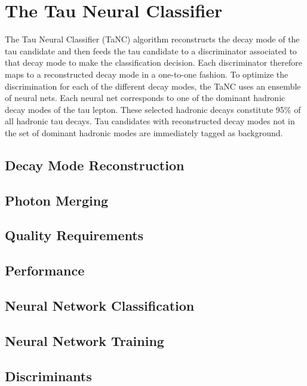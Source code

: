 \section{The Tau Neural Classifier}
\label{sec:Tanc}
%
The Tau Neural Classifier (TaNC) algorithm reconstructs the decay mode of the
tau candidate and then feeds the tau candidate to a discriminator associated
to that decay mode to make the classification decision.  Each discriminator
therefore maps to a reconstructed decay mode in a one-to-one fashion.  To
optimize the discrimination for each of the different decay modes, the TaNC uses
an ensemble of neural nets.  Each neural net corresponds to one of the dominant
hadronic decay modes of the tau lepton.  These selected hadronic decays
constitute 95\% of all hadronic tau decays.  Tau candidates with reconstructed
decay modes not in the set of dominant hadronic modes are immediately tagged as
background.  

\subsection{Decay Mode Reconstruction}
\label{sec:decay_mode_reco}

\subsection{Photon Merging}

\subsection{Quality Requirements}

\subsection{Performance}


\subsection{Neural Network Classification}
\label{sec:tanc_nn_training}
\subsection{Neural Network Training}

\subsection{Discriminants}
\label{sec:tanc_nn_discriminants}


